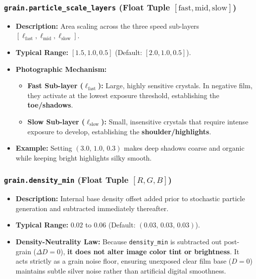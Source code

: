 \documentclass[11pt,a4paper]{article}
\begin{document}
\subsubsection{\texttt{grain.particle\_scale\_layers} (Float Tuple $[\text{fast}, \text{mid}, \text{slow}]$)}
\begin{itemize}[leftmargin=*]
    \item \textbf{Description:} Area scaling across the three speed sub-layers $[\ell_{\text{fast}}, \ell_{\text{mid}}, \ell_{\text{slow}}]$.
    \item \textbf{Typical Range:} $[1.5, 1.0, 0.5]$ (Default: $[2.0, 1.0, 0.5]$).
    \item \textbf{Photographic Mechanism:}
    \begin{itemize}
        \item \textbf{Fast Sub-layer ($\ell_{\text{fast}}$):} Large, highly sensitive crystals. In negative film, they activate at the lowest exposure threshold, establishing the \textbf{toe/shadows}.
        \item \textbf{Slow Sub-layer ($\ell_{\text{slow}}$):} Small, insensitive crystals that require intense exposure to develop, establishing the \textbf{shoulder/highlights}.
    \end{itemize}
    \item \textbf{Example:} Setting $(3.0,\, 1.0,\, 0.3)$ makes deep shadows coarse and organic while keeping bright highlights silky smooth.
\end{itemize}

\subsubsection{\texttt{grain.density\_min} (Float Tuple $[R, G, B]$)}
\begin{itemize}[leftmargin=*]
    \item \textbf{Description:} Internal base density offset added prior to stochastic particle generation and subtracted immediately thereafter.
    \item \textbf{Typical Range:} $0.02$ to $0.06$ (Default: $(0.03,\, 0.03,\, 0.03)$).
    \item \textbf{Density-Neutrality Law:} Because \texttt{density\_min} is subtracted out post-grain ($\Delta D = 0$), \textbf{it does not alter image color tint or brightness}. It acts strictly as a grain noise floor, ensuring unexposed clear film base ($D = 0$) maintains subtle silver noise rather than artificial digital smoothness.
\end{itemize}
\end{document}
